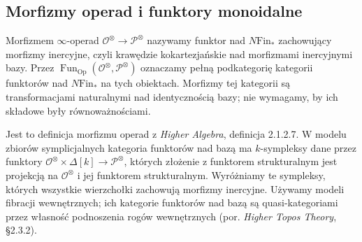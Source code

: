 \subsection{Morfizmy operad i funktory monoidalne}

\begin{definicja}\label{cat:def:infty-operad-morphism}
Morfizmem $\infty$-operad $\mathcal O^\otimes\to\mathcal P^\otimes$ nazywamy funktor nad $N\mathrm{Fin}_*$ zachowujący morfizmy inercyjne, czyli krawędzie kokartezjańskie nad morfizmami inercyjnymi bazy. Przez $\operatorname{Fun}_{\mathrm{Op}}(\mathcal O^\otimes,\mathcal P^\otimes)$ oznaczamy pełną podkategorię kategorii funktorów nad $N\mathrm{Fin}_*$ na tych obiektach. Morfizmy tej kategorii są transformacjami naturalnymi nad identycznością bazy; nie wymagamy, by ich składowe były równoważnościami.
\end{definicja}

Jest to definicja morfizmu operad z \emph{Higher Algebra}, definicja 2.1.2.7. W modelu zbiorów symplicjalnych kategoria funktorów nad bazą ma $k$-sympleksy dane przez funktory $\mathcal O^\otimes\times\Delta[k]\to\mathcal P^\otimes$, których złożenie z funktorem strukturalnym jest projekcją na $\mathcal O^\otimes$ i jej funktorem strukturalnym. Wyróżniamy te sympleksy, których wszystkie wierzchołki zachowują morfizmy inercyjne. Używamy modeli fibracji wewnętrznych; ich kategorie funktorów nad bazą są quasi-kategoriami przez własność podnoszenia rogów wewnętrznych (por. \emph{Higher Topos Theory}, \S2.3.2).

